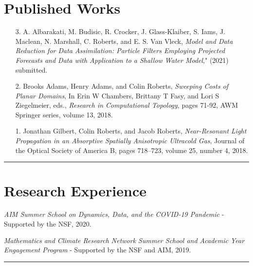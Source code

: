 \documentclass[12pt]{article} %
\begin{document}
\section{Published Works}
\begin{flushleft}
\begin{itemize}[leftmargin=*]
    \item[3.] A. Albarakati, M. Budisic, R. Crocker, J. Glass-Klaiber, S. Iams, J. Maclean, N. Marshall, C. Roberts,
and E. S. Van Vleck, \textit{Model and Data Reduction for Data Assimilation: Particle Filters Employing
Projected Forecasts and Data with Application to a Shallow Water Model}," (2021) submitted.

    \item[2.] Brooks Adams, Henry Adams, and Colin Roberts, \textit{Sweeping Costs of Planar Domains}, In Erin W Chambers, Brittany T Fasy, and Lori S Ziegelmeier, eds., \emph{Research in Computational Topology}, pages 71-92, AWM Springer series, volume 13, 2018.
    
    \item[1.] Jonathan Gilbert, Colin Roberts, and Jacob Roberts, \textit{Near-Resonant Light Propagation in an Absorptive Spatially Anisotropic Ultracold Gas}, Journal of the Optical Society of America B, pages 718–723, volume 25, number 4, 2018.
\end{itemize}
\end{flushleft}
\rule{\textwidth}{0.5mm}

\section{Research Experience}
\begin{flushleft}
    \emph{AIM Summer School on Dynamics, Data, and the COVID-19 Pandemic} - Supported by the NSF, 2020.\\
\vspace*{5pt}

    \emph{Mathematics and Climate Research Network Summer School and Academic Year Engagement Program} - Supported by the NSF and AIM, 2019.
\end{flushleft}
\rule{\textwidth}{0.5mm}
\end{document}
